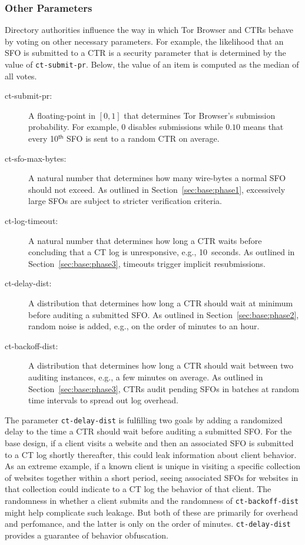 \subsubsection{Other Parameters} \label{sec:base:consensus:params}
Directory authorities influence the way in which Tor Browser and CTRs behave by
voting on other necessary parameters.  For example, the likelihood that
an SFO is submitted to a CTR is a security parameter that is determined by the
value of \texttt{ct-submit-pr}.  Below, the value of an item is computed as the
median of all votes.
\begin{description}
	\item[ct-submit-pr:] A floating-point in $[0,1]$ that determines Tor
		Browser's submission probability.  For example, $0$ disables submissions
		while $0.10$ means that every 10$^{\mathsf{th}}$ SFO is sent to a
		random CTR on average.
	\item[ct-sfo-max-bytes:] A natural number that determines how many
		wire-bytes a normal SFO should not exceed.  As outlined in
		Section~\ref{sec:base:phase1}, excessively large SFOs are subject
		to stricter verification criteria.
	\item[ct-log-timeout:] A natural number that determines how long a CTR
		waits before concluding that a CT log is unresponsive, e.g., 10~seconds.
		As outlined in Section~\ref{sec:base:phase3}, timeouts trigger implicit
		resubmissions.
	\item[ct-delay-dist:] A distribution that determines how long a CTR should
		wait at minimum before auditing a submitted SFO\@.  As outlined in
		Section~\ref{sec:base:phase2}, random noise is added, e.g., on the order of minutes to an hour.
	\item[ct-backoff-dist:]
		A distribution that determines how long a CTR should wait between two
		auditing instances, e.g., a few minutes on average.  As outlined in
		Section~\ref{sec:base:phase3}, CTRs audit pending SFOs in batches at
		random time intervals to spread out log overhead.
\end{description}

The parameter \texttt{ct-delay-dist} is fulfilling two goals by adding
a randomized delay to the time a CTR should wait before auditing a
submitted SFO\@. For the base design, if a client visits a website and
then an associated SFO is submitted to a CT log shortly thereafter,
this could leak information about client behavior. As an extreme
example, if a known client is unique in visiting a specific collection
of websites together within a short period, seeing associated SFOs for
websites in that collection could indicate to a CT log the behavior of
that client. The randomness in whether a client submits and the
randomness of \texttt{ct-backoff-dist} might help complicate such
leakage. But both of these are primarily for overhead and perfomance,
and the latter is only on the order of minutes. \texttt{ct-delay-dist}
provides a guarantee of behavior obfuscation. 

